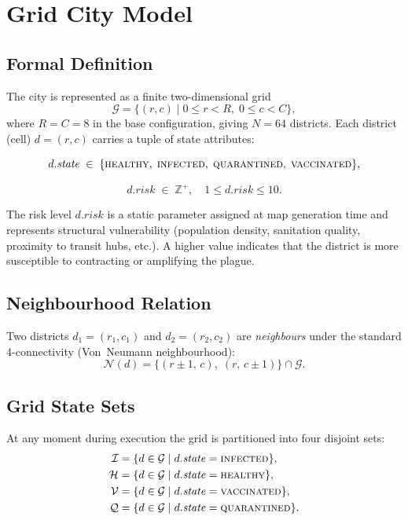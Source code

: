\documentclass[conference]{IEEEtran}
\begin{document}
\section{Grid City Model}
\label{sec:model}

\subsection{Formal Definition}

The city is represented as a finite two-dimensional grid
\[
  \mathcal{G} = \{(r,c) \mid 0 \le r < R,\; 0 \le c < C\},
\]
where $R = C = 8$ in the base configuration, giving $N = 64$ districts. Each
district (cell) $d = (r,c)$ carries a tuple of state attributes:

\begin{equation}
  d.\mathit{state} \;\in\; \{\textsc{healthy},\; \textsc{infected},\;
    \textsc{quarantined},\; \textsc{vaccinated}\},
  \label{eq:state}
\end{equation}

\begin{equation}
  d.\mathit{risk} \;\in\; \mathbb{Z}^+, \quad 1 \le d.\mathit{risk} \le 10.
  \label{eq:risk}
\end{equation}

The risk level $d.\mathit{risk}$ is a static parameter assigned at map generation
time and represents structural vulnerability (population density, sanitation quality,
proximity to transit hubs, etc.). A higher value indicates that the district is more
susceptible to contracting or amplifying the plague.

\subsection{Neighbourhood Relation}

Two districts $d_1 = (r_1, c_1)$ and $d_2 = (r_2, c_2)$ are
\emph{neighbours} under the standard 4-connectivity (Von~Neumann neighbourhood):
\[
  \mathcal{N}(d) = \{(r \pm 1,\, c),\; (r,\, c \pm 1)\} \cap \mathcal{G}.
\]

\subsection{Grid State Sets}

At any moment during execution the grid is partitioned into four disjoint sets:
\begin{align}
  \mathcal{I} &= \{d \in \mathcal{G} \mid d.\mathit{state} = \textsc{infected}\},
    \label{eq:infected}\\
  \mathcal{H} &= \{d \in \mathcal{G} \mid d.\mathit{state} = \textsc{healthy}\},
    \label{eq:healthy}\\
  \mathcal{V} &= \{d \in \mathcal{G} \mid d.\mathit{state} = \textsc{vaccinated}\},
    \label{eq:vaccinated}\\
  \mathcal{Q} &= \{d \in \mathcal{G} \mid d.\mathit{state} = \textsc{quarantined}\}.
    \label{eq:quarantined}
\end{align}
\end{document}
